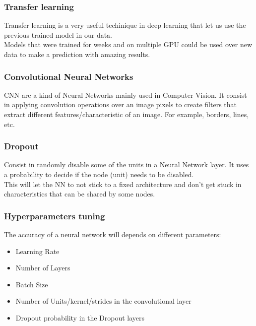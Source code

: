 \documentclass[a4paper,10pt]{article}
\begin{document}
\newpage

\subsubsection{Transfer learning}

Transfer learning is a very useful techinique in deep learning that let us use the previous trained model in our data. \\

Models that were trained for weeks and on multiple GPU could be used over new data to make a prediction with amazing results. \\

\subsubsection{Convolutional Neural Networks}

CNN are a kind of Neural Networks mainly used in Computer Vision. It consist in applying convolution operations over an image pixels to create filters that extract different features/characteristic of an image. For example, borders, lines, etc. \\


\subsubsection{Dropout}

Consist in randomly disable some of the units in a Neural Network layer. It uses a probability to decide if the node (unit) needs to be disabled. \\

This will let the NN to not stick to a fixed architecture and don't get stuck in characteristics that can be shared by some nodes. \\
 
\subsubsection{Hyperparameters tuning}

The accuracy of a neural network will depends on different parameters:

\begin{itemize}
  \item Learning Rate
  \item Number of Layers
  \item Batch Size
  \item Number of Units/kernel/strides in the convolutional layer
  \item Dropout probability in the Dropout layers
\end{itemize}
\end{document}
